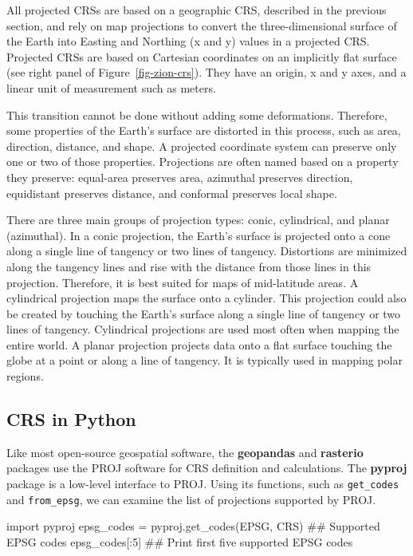 \documentclass[
  letterpaper,
]{krantz}
\newenvironment{Shaded}{\begin{snugshade}}{\end{snugshade}}
\newcommand{\CommentTok}[1]{\textcolor[rgb]{0.37,0.37,0.37}{#1}}
\newcommand{\DecValTok}[1]{\textcolor[rgb]{0.68,0.00,0.00}{#1}}
\newcommand{\ImportTok}[1]{\textcolor[rgb]{0.00,0.46,0.62}{#1}}
\newcommand{\NormalTok}[1]{\textcolor[rgb]{0.00,0.23,0.31}{#1}}
\newcommand{\OperatorTok}[1]{\textcolor[rgb]{0.37,0.37,0.37}{#1}}
\newcommand{\StringTok}[1]{\textcolor[rgb]{0.13,0.47,0.30}{#1}}
\begin{document}
All projected CRSs are based on a geographic CRS, described in the
previous section, and rely on map projections to convert the
three-dimensional surface of the Earth into Easting and Northing (x and
y) values in a projected CRS. Projected CRSs are based on Cartesian
coordinates on an implicitly flat surface (see right panel of
Figure~\ref{fig-zion-crs}). They have an origin, x and y axes, and a
linear unit of measurement such as meters.

This transition cannot be done without adding some deformations.
Therefore, some properties of the Earth's surface are distorted in this
process, such as area, direction, distance, and shape. A projected
coordinate system can preserve only one or two of those properties.
Projections are often named based on a property they preserve:
equal-area preserves area, azimuthal preserves direction, equidistant
preserves distance, and conformal preserves local shape.

There are three main groups of projection types: conic, cylindrical, and
planar (azimuthal). In a conic projection, the Earth's surface is
projected onto a cone along a single line of tangency or two lines of
tangency. Distortions are minimized along the tangency lines and rise
with the distance from those lines in this projection. Therefore, it is
best suited for maps of mid-latitude areas. A cylindrical projection
maps the surface onto a cylinder. This projection could also be created
by touching the Earth's surface along a single line of tangency or two
lines of tangency. Cylindrical projections are used most often when
mapping the entire world. A planar projection projects data onto a flat
surface touching the globe at a point or along a line of tangency. It is
typically used in mapping polar regions.

\subsection{CRS in Python}\label{sec-crs-python}

Like most open-source geospatial software, the \textbf{geopandas} and
\textbf{rasterio} packages use the PROJ software for CRS definition and
calculations. The \textbf{pyproj} package is a low-level interface to
PROJ. Using its functions, such as \texttt{get\_codes} and
\texttt{from\_epsg}, we can examine the list of projections supported by
PROJ.

\begin{Shaded}
\begin{Highlighting}[]
\ImportTok{import}\NormalTok{ pyproj}
\NormalTok{epsg\_codes }\OperatorTok{=}\NormalTok{ pyproj.get\_codes(}\StringTok{\textquotesingle{}EPSG\textquotesingle{}}\NormalTok{, }\StringTok{\textquotesingle{}CRS\textquotesingle{}}\NormalTok{)  }\CommentTok{\#\# Supported EPSG codes}
\NormalTok{epsg\_codes[:}\DecValTok{5}\NormalTok{]  }\CommentTok{\#\# Print first five supported EPSG codes}
\end{Highlighting}
\end{Shaded}
\end{document}
